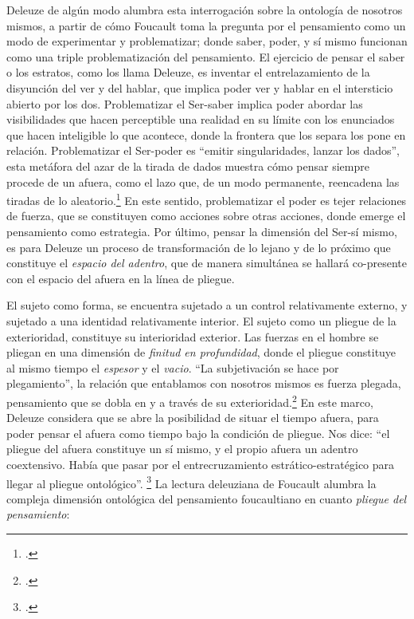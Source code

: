 Deleuze de algún modo alumbra esta interrogación sobre la ontología de nosotros mismos, a partir de cómo Foucault toma la pregunta por el pensamiento como un modo de experimentar y problematizar; donde saber, poder, y sí mismo funcionan como una triple problematización del pensamiento. El ejercicio de pensar el saber o los estratos, como los llama Deleuze, es inventar el entrelazamiento de la disyunción del ver y del hablar, que implica poder ver y hablar en el intersticio abierto por los dos. Problematizar el Ser-saber implica poder abordar las visibilidades que hacen perceptible una realidad en su límite con los enunciados que hacen inteligible lo que acontece, donde la frontera que los separa los pone en relación. Problematizar el Ser-poder es \enquote{emitir singularidades, lanzar los dados}, esta metáfora del azar de la tirada de dados muestra cómo pensar siempre procede de un afuera, como el lazo que, de un modo permanente, reencadena las tiradas de lo aleatorio.\footcite[][152]{@7053-DELEUZE2008} En este sentido, problematizar el poder es tejer relaciones de fuerza, que se constituyen como acciones sobre otras acciones, donde emerge el pensamiento como estrategia. Por último, pensar la dimensión del Ser-sí mismo, es para Deleuze un proceso de transformación de lo lejano y de lo próximo que constituye el \emph{espacio del adentro}, que de manera simultánea se hallará co-presente con el espacio del afuera en la línea de pliegue.

El sujeto como forma, se encuentra sujetado a un control relativamente externo, y sujetado a una identidad relativamente interior. El sujeto como un pliegue de la exterioridad, constituye su interioridad exterior. Las fuerzas en el hombre se pliegan en una dimensión de \emph{finitud en profundidad}, donde el pliegue constituye al mismo tiempo el \emph{espesor} y el \emph{vacio}. \enquote{La subjetivación se hace por plegamiento}, la relación que entablamos con nosotros mismos es fuerza plegada, pensamiento que se dobla en y a través de su exterioridad.\footcite[][137]{@7053-DELEUZE2008} En este marco, Deleuze considera que se abre la posibilidad de situar el tiempo afuera, para poder pensar el afuera como tiempo bajo la condición de pliegue. Nos dice: \enquote{el pliegue del afuera constituye un sí mismo, y el propio afuera un adentro coextensivo. Había que pasar por el entrecruzamiento estrático-estratégico para llegar al pliegue ontológico}. \footcite[][148]{@7053-DELEUZE2008} La lectura deleuziana de Foucault alumbra la compleja dimensión ontológica del pensamiento foucaultiano en cuanto \emph{pliegue del pensamiento}:

